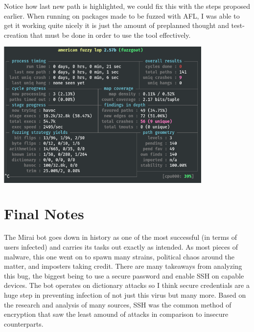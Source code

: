 \documentclass[12pt, letterpaper]{article}
\begin{document}
\begin{sloppypar}
\begin{flushleft}
Notice how last new path is highlighted, we could fix this with the steps proposed earlier.
When running on packages made to be fuzzed with AFL, I was able to get it working quite nicely
it is just the amount of preplanned thought and test-creation that must be done in order to 
use the tool effectively. 

\begin{center}
{\includegraphics[width=0.8\textwidth]{afl-fuzz-pass.png}}
\end{center}

\section*{Final Notes}
The Mirai bot goes down in history as one of the most successful (in terms of users infected)
and carries its tasks out exactly as intended. As most pieces of malware, this one went on 
to spawn many strains, political chaos around the matter, and imposters taking credit. There
are many takeaways from analyzing this bug, the biggest being to use a secure password and 
enable SSH on capable devices. The bot operates on dictionary attacks so I think secure 
credentials are a huge step in preventing infection of not just this virus but many more. 
Based on the research and analysis of many sources, SSH was the common method of encryption that 
saw the least amound of attacks in comparison to insecure counterparts. 

\end{flushleft}
\end{sloppypar}
\end{document}
